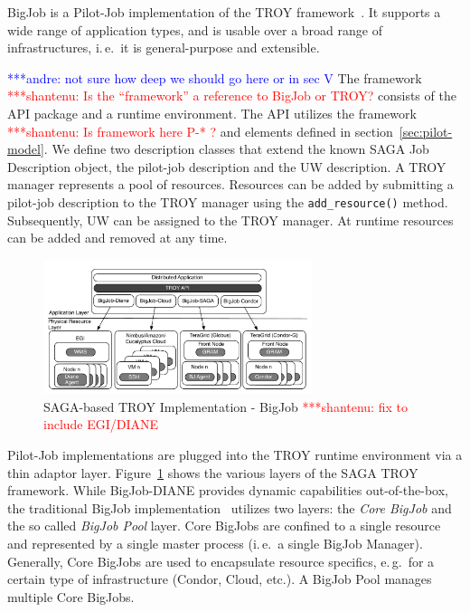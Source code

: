 \documentclass[conference,final]{IEEEtran}
\newcommand{\jhanote}[1]{ {\textcolor{red} { ***shantenu: #1 }}}
\newcommand{\alnote}[1]{ {\textcolor{blue} { ***andre: #1 }}}
\newcommand{\alnote}[1]{}
\newcommand{\jhanote}[1]{}
\begin{document}
BigJob is a Pilot-Job implementation of the TROY
framework~\cite{bigjob_web}. It supports a wide range of application
types, and is usable over a broad range of infrastructures, i.\,e.\ it
is general-purpose and extensible.

\alnote{not sure how deep we should go here or in sec V} The framework
\jhanote{Is the ``framework'' a reference to BigJob or TROY?} consists
of the API package and a runtime environment. The API utilizes the
framework \jhanote{Is framework here P-* ?} and elements defined in
section~\ref{sec:pilot-model}. We define two description classes that
extend the known SAGA Job Description object, the pilot-job
description and the UW description. A TROY manager represents a pool
of resources. Resources can be added by submitting a pilot-job
description to the TROY manager using the \texttt{add\_resource()}
method.  Subsequently, UW can be assigned to the TROY manager. At
runtime resources can be added and removed at any time.


\begin{figure}[htbp]
	\centering
		\includegraphics[width=0.7\textwidth]{figures/distributed_pilot_job.pdf}
	\caption{SAGA-based TROY Implementation - BigJob \jhanote{fix
            to include EGI/DIANE}}
	\label{fig:figures_distributed_pilot_job}
\end{figure}

Pilot-Job implementations are plugged into the TROY runtime environment via a
thin adaptor layer. Figure~\ref{fig:figures_distributed_pilot_job} shows the
various layers of the SAGA TROY framework. While BigJob-DIANE provides dynamic
capabilities out-of-the-box, the traditional BigJob
implementation~\cite{saga_bigjob_condor_cloud} utilizes two layers: the
\emph{Core BigJob} and the so called \emph{BigJob Pool} layer. Core BigJobs are
confined to a single resource and represented by a single master process
(i.\,e.\ a single BigJob Manager). Generally, Core BigJobs are used to
encapsulate resource specifics, e.\,g.\ for a certain type of infrastructure
(Condor, Cloud, etc.). A BigJob Pool manages multiple Core BigJobs.
\end{document}
